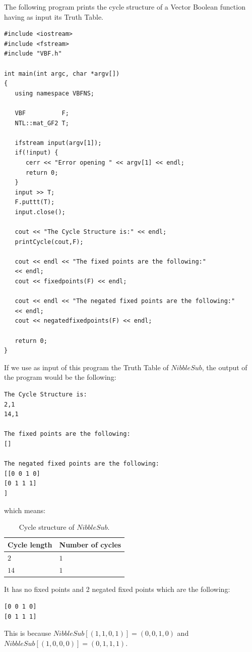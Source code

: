 \begin{example}
The following program prints the cycle structure of a Vector Boolean function having as input its Truth Table.

\begin{verbatim}
#include <iostream>
#include <fstream>
#include "VBF.h"

int main(int argc, char *argv[])
{
   using namespace VBFNS;

   VBF          F;
   NTL::mat_GF2 T;

   ifstream input(argv[1]);
   if(!input) {
      cerr << "Error opening " << argv[1] << endl;
      return 0;
   }
   input >> T;
   F.puttt(T);
   input.close();

   cout << "The Cycle Structure is:" << endl;
   printCycle(cout,F);

   cout << endl << "The fixed points are the following:"
   << endl;
   cout << fixedpoints(F) << endl;

   cout << endl << "The negated fixed points are the following:"
   << endl;
   cout << negatedfixedpoints(F) << endl;

   return 0;
}
\end{verbatim}

If we use as input of this program the Truth Table of $NibbleSub$, the output of the program would be the following:

\begin{verbatim}
The Cycle Structure is:
2,1
14,1

The fixed points are the following:
[]

The negated fixed points are the following:
[[0 0 1 0]
[0 1 1 1]
]
\end{verbatim}

which means:

\begin{table}[htbp]
\caption{Cycle structure of $NibbleSub$.}
\centering
\label{tab:CS-NibbleSub}
\begin{tabular}{ l l }
\toprule
Cycle length & Number of cycles \\
\midrule
$2$ & $1$ \\
$14$ & $1$ \\
\bottomrule
\end{tabular}
\end{table}

It has no fixed points and 2 negated fixed points which are the following:

\begin{verbatim}
[0 0 1 0]
[0 1 1 1]
\end{verbatim}

This is because $NibbleSub[(1,1,0,1)]=(0,0,1,0)$ and $NibbleSub[(1,0,0,0)]=(0,1,1,1)$.
\end{example}

